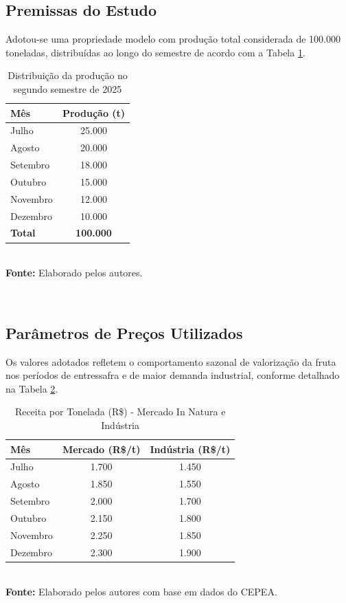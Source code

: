 \documentclass[12pt, a4paper]{article}
\providecommand{\IBGEtab}[3]{%
    \begin{center}
        #1\vspace{0.1cm}\\
        #2\vspace{0.1cm}\\
        #3
    \end{center}
}
\providecommand{\fonte}[1]{%
    \vspace{0.1cm}
    \small\textbf{Fonte:} #1
}
\begin{document}
\subsection{Premissas do Estudo}
Adotou-se uma propriedade modelo com produção total considerada de 100.000 toneladas, distribuídas ao longo do semestre de acordo com a Tabela \ref{tab:producao}.

\begin{table}[H]
    \caption{Distribuição da produção no segundo semestre de 2025}
    \label{tab:producao}
    \IBGEtab{
        \begin{tabular}{lc}
        \toprule
        \textbf{Mês} & \textbf{Produção (t)} \\
        \midrule
        Julho & 25.000 \\
        Agosto & 20.000 \\
        Setembro & 18.000 \\
        Outubro & 15.000 \\
        Novembro & 12.000 \\
        Dezembro & 10.000 \\
        \midrule
        \textbf{Total} & \textbf{100.000} \\
        \bottomrule
        \end{tabular}
    }{
        \fonte{Elaborado pelos autores.}
    }{}
\end{table}

\subsection{Parâmetros de Preços Utilizados}
Os valores adotados refletem o comportamento sazonal de valorização da fruta nos períodos de entressafra e de maior demanda industrial, conforme detalhado na Tabela \ref{tab:precos}\cite{cepea_citros}.

\begin{table}[H]
    \caption{Receita por Tonelada (R\$) - Mercado In Natura e Indústria}
    \label{tab:precos}
    \IBGEtab{
        \begin{tabular}{lcc}
        \toprule
        \textbf{Mês} & \textbf{Mercado (R\$/t)} & \textbf{Indústria (R\$/t)} \\
        \midrule
        Julho & 1.700 & 1.450 \\
        Agosto & 1.850 & 1.550 \\
        Setembro & 2.000 & 1.700 \\
        Outubro & 2.150 & 1.800 \\
        Novembro & 2.250 & 1.850 \\
        Dezembro & 2.300 & 1.900 \\
        \bottomrule
        \end{tabular}
    }{
        \fonte{Elaborado pelos autores com base em dados do CEPEA.}
    }{}
\end{table}
\end{document}

